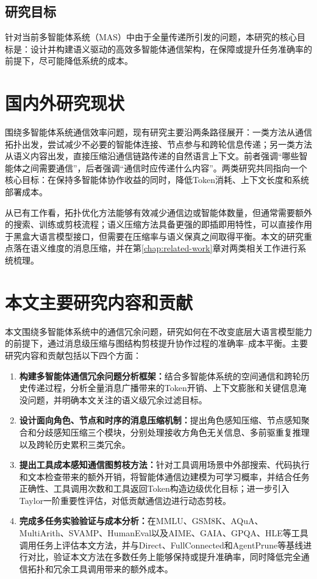 \subsection{研究目标}
针对当前多智能体系统（MAS）中由于全量传递所引发的问题，本研究的核心目标是：设计并构建语义驱动的高效多智能体通信架构，在保障或提升任务准确率的前提下，尽可能降低系统的成本。

\section{国内外研究现状}

围绕多智能体系统通信效率问题，现有研究主要沿两条路径展开：一类方法从通信拓扑出发，尝试减少不必要的智能体连接、节点参与和跨轮信息传递；另一类方法从语义内容出发，直接压缩沿通信链路传递的自然语言上下文。前者强调“哪些智能体之间需要通信”，后者强调“通信时应传递什么内容”。两类研究共同指向一个核心目标：在保持多智能体协作收益的同时，降低Token消耗、上下文长度和系统部署成本。

从已有工作看，拓扑优化方法能够有效减少通信边或智能体数量，但通常需要额外的搜索、训练或剪枝流程；语义压缩方法具备更强的即插即用特性，可以直接作用于黑盒大语言模型接口，但需要在压缩率与语义保真之间取得平衡。本文的研究重点落在语义维度的消息压缩，并在第\ref{chap:related-work}章对两类相关工作进行系统梳理。

\section{本文主要研究内容和贡献}

本文围绕多智能体系统中的通信冗余问题，研究如何在不改变底层大语言模型能力的前提下，通过消息级压缩与图结构剪枝提升协作过程的准确率--成本平衡。主要研究内容和贡献包括以下四个方面：

\begin{enumerate}[topsep=0pt,itemsep=0pt,parsep=0pt,partopsep=0pt,leftmargin=0em,itemindent=2em,label=\arabic*.]
  \item \textbf{构建多智能体通信冗余问题分析框架：}结合多智能体系统的空间通信和跨轮历史传递过程，分析全量消息广播带来的Token开销、上下文膨胀和关键信息淹没问题，并明确本文关注的语义级冗余过滤目标。
  \item \textbf{设计面向角色、节点和时序的消息压缩机制：}提出角色感知压缩、节点感知聚合和分歧感知压缩三个模块，分别处理接收方角色无关信息、多前驱重复推理以及跨轮历史累积三类冗余。
  \item \textbf{提出工具成本感知通信图剪枝方法：}针对工具调用场景中外部搜索、代码执行和文本检查带来的额外开销，将智能体通信边建模为可学习概率，并结合任务正确性、工具调用次数和工具返回Token构造边级优化目标；进一步引入Taylor一阶重要性评估，对低贡献通信边进行动态剪枝。
  \item \textbf{完成多任务实验验证与成本分析：}在MMLU、GSM8K、AQuA、MultiArith、SVAMP、HumanEval以及AIME、GAIA、GPQA、HLE等工具调用任务上评估本文方法，并与Direct、FullConnected和AgentPrune等基线进行对比，验证本文方法在多数任务上能够保持或提升准确率，同时降低完全通信拓扑和冗余工具调用带来的额外成本。
\end{enumerate}

